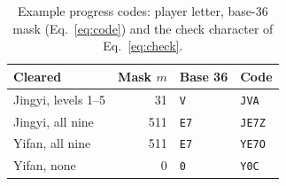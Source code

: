 \documentclass[sigconf,nonacm]{acmart}
\newcommand{\code}[1]{\textnormal{\texttt{\small #1}}}
\begin{document}
\begin{table}[t]
  \caption{Example progress codes: player letter, base-36 mask (Eq.~\ref{eq:code}) and the check character of Eq.~\ref{eq:check}.}
  \label{tab:codes}
  \small
  \begin{tabular}{@{}lrll@{}}
    \toprule
    Cleared & Mask $m$ & Base 36 & Code \\
    \midrule
    Jingyi, levels 1--5 & 31 & \code{V} & \code{JVA} \\
    Jingyi, all nine & 511 & \code{E7} & \code{JE7Z} \\
    Yifan, all nine & 511 & \code{E7} & \code{YE7O} \\
    Yifan, none & 0 & \code{0} & \code{Y0C} \\
    \bottomrule
  \end{tabular}

\end{table}
\end{document}
